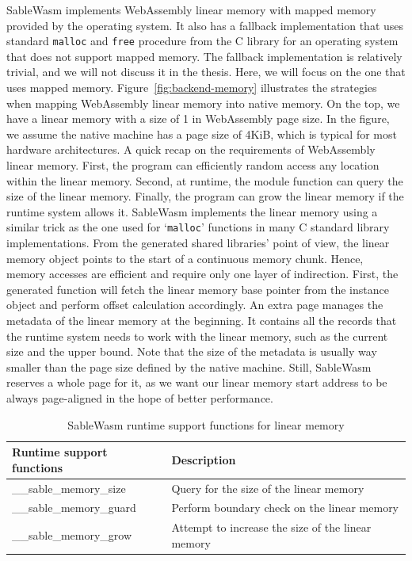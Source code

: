 SableWasm implements WebAssembly linear memory with mapped memory provided by the operating system. It also has a fallback implementation that uses standard \texttt{malloc} and \texttt{free} procedure from the C library for an operating system that does not support mapped memory. The fallback implementation is relatively trivial, and we will not discuss it in the thesis. Here, we will focus on the one that uses mapped memory. Figure~\ref{fig:backend-memory} illustrates the strategies when mapping WebAssembly linear memory into native memory. On the top, we have a linear memory with a size of 1 in WebAssembly page size. In the figure, we assume the native machine has a page size of 4KiB, which is typical for most hardware architectures. A quick recap on the requirements of WebAssembly linear memory. First, the program can efficiently random access any location within the linear memory. Second, at runtime, the module function can query the size of the linear memory. Finally, the program can grow the linear memory if the runtime system allows it. SableWasm implements the linear memory using a similar trick as the one used for `\texttt{malloc}' functions in many C standard library implementations. From the generated shared libraries' point of view, the linear memory object points to the start of a continuous memory chunk. Hence, memory accesses are efficient and require only one layer of indirection. First, the generated function will fetch the linear memory base pointer from the instance object and perform offset calculation accordingly. An extra page manages the metadata of the linear memory at the beginning. It contains all the records that the runtime system needs to work with the linear memory, such as the current size and the upper bound. Note that the size of the metadata is usually way smaller than the page size defined by the native machine. Still, SableWasm reserves a whole page for it, as we want our linear memory start address to be always page-aligned in the hope of better performance.

\begin{table}[h]
    \centering
    \begin{tabular}{|l|l|}
        \hline
        \textbf{Runtime support functions} & \textbf{Description}                              \\ \hline
        \_\_sable\_memory\_size            & Query for the size of the linear memory           \\ \hline
        \_\_sable\_memory\_guard           & Perform boundary check on the linear memory       \\ \hline
        \_\_sable\_memory\_grow            & Attempt to increase the size of the linear memory \\ \hline
    \end{tabular}
    \caption{SableWasm runtime support functions for linear memory}
    \label{tbl:sablewasm-runtime-memory-api}
\end{table}

